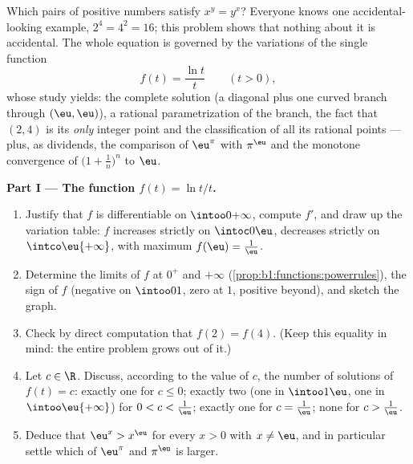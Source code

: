 \begin{problem}\label{pb:b1:functions:1}
Which pairs of positive numbers satisfy $x^y = y^x$? Everyone knows
one accidental-looking example, $2^4 = 4^2 = 16$; this problem shows
that nothing about it is accidental. The whole equation is governed
by the variations of the single function
\[
f(t) = \frac{\ln t}{t} \qquad (t > 0),
\]
whose study yields: the complete solution  (a diagonal plus one
curved branch through $(\eu, \eu)$), a rational parametrization of
the branch, the fact that $(2, 4)$ is its \emph{only} integer point
and the classification of all its rational points --- plus, as
dividends, the comparison of $\eu^\pi$ with $\pi^\eu$ and the
monotone convergence of $\bigl(1 + \frac1n\bigr)^n$ to $\eu$.

\medskip
\noindent\textbf{Part I --- The function $f(t) = \ln t / t$.}
\begin{enumerate}
  \item Justify that $f$ is differentiable on $\intoo0{+\infty}$,
        compute $f'$, and draw up the variation table: $f$
        increases strictly on $\intoc0\eu$, decreases strictly on
        $\intco\eu{+\infty}$, with maximum $f(\eu) = \frac1\eu$.
  \item Determine the limits of $f$ at $0^+$ and $+\infty$
        (\cref{prop:b1:functions:powerrules}), the sign of $f$
        (negative on $\intoo01$, zero at $1$, positive beyond),
        and sketch the graph.
  \item Check by direct computation that $f(2) = f(4)$. (Keep this
        equality in mind: the entire problem grows out of it.)
  \item Let $c \in \R$. Discuss, according to the value of $c$, the
        number of solutions of $f(t) = c$: exactly one for $c \leq
        0$; exactly two (one in $\intoo1\eu$, one in
        $\intoo\eu{+\infty}$) for $0 < c < \frac1\eu$; exactly one
        for $c = \frac1\eu$; none for $c > \frac1\eu$.
  \item Deduce that $\eu^x > x^\eu$ for every $x > 0$ with $x \neq
        \eu$, and in particular settle which of $\eu^\pi$ and
        $\pi^\eu$ is larger.
\end{enumerate}


\end{problem}
